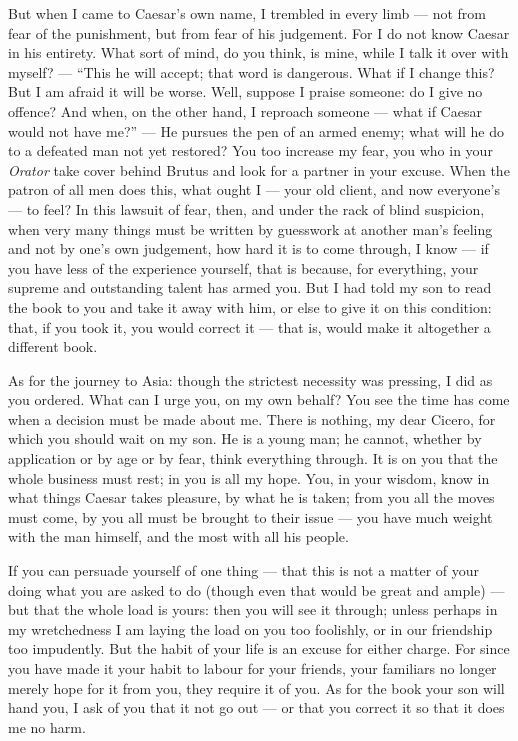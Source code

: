  But when I came to Caesar's own name, I trembled in every limb --- not from fear of the punishment, but from fear of his judgement. For I do not know Caesar in his entirety. What sort of mind, do you think, is mine, while I talk it over with myself? --- ``This he will accept; that word is dangerous. What if I change this? But I am afraid it will be worse. Well, suppose I praise someone: do I give no offence? And when, on the other hand, I reproach someone --- what if Caesar would not have me?'' --- He pursues the pen of an armed enemy; what will he do to a defeated man not yet restored? You too increase my fear, you who in your \textit{Orator} take cover behind Brutus and look for a partner in your excuse. When the patron of all men does this, what ought I --- your old client, and now everyone's --- to feel? In this lawsuit of fear, then, and under the rack of blind suspicion, when very many things must be written by guesswork at another man's feeling and not by one's own judgement, how hard it is to come through, I know --- if you have less of the experience yourself, that is because, for everything, your supreme and outstanding talent has armed you. But I had told my son to read the book to you and take it away with him, or else to give it on this condition: that, if you took it, you would correct it --- that is, would make it altogether a different book.

 As for the journey to Asia: though the strictest necessity was pressing, I did as you ordered. What can I urge you, on my own behalf? You see the time has come when a decision must be made about me. There is nothing, my dear Cicero, for which you should wait on my son. He is a young man; he cannot, whether by application or by age or by fear, think everything through. It is on you that the whole business must rest; in you is all my hope. You, in your wisdom, know in what things Caesar takes pleasure, by what he is taken; from you all the moves must come, by you all must be brought to their issue --- you have much weight with the man himself, and the most with all his people.

 If you can persuade yourself of one thing --- that this is not a matter of your doing what you are asked to do (though even that would be great and ample) --- but that the whole load is yours: then you will see it through; unless perhaps in my wretchedness I am laying the load on you too foolishly, or in our friendship too impudently. But the habit of your life is an excuse for either charge. For since you have made it your habit to labour for your friends, your familiars no longer merely hope for it from you, they require it of you. As for the book your son will hand you, I ask of you that it not go out --- or that you correct it so that it does me no harm.
